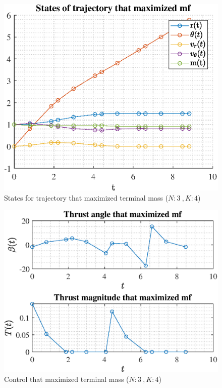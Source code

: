 \documentclass[]{article}
\begin{document}
	\begin{figure}
		\centering
		\includegraphics[scale=0.75]{states_N3_K4_C3_mf.eps}
		\caption{States for trajectory that maximized terminal mass (\(N:3\ , K:4\))}
		\label{fig:states_N3_K4_C3_mf}
	\end{figure}
	\begin{figure}
		\centering
		\includegraphics[scale=0.75]{control_N3_K4_C3_mf.eps}
		\caption{Control that maximized terminal mass (\(N:3\ , K:4\))}
		\label{fig:control_N3_K4_C3_mf}
	\end{figure}
\end{document}
